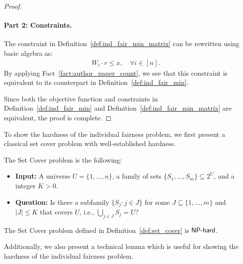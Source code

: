 \begin{proof}
\paragraph{Part 2: Constraints.} The constraint in Definition~\ref{def:ind_fair_min_matrix} can be rewritten using basic algebra as:
     \begin{align*}
         W_i \cdot r \leq x, \quad \forall i \in [n].
     \end{align*}
     By applying Fact~\ref{fact:author_paper_count}, we see that this constraint is equivalent to its counterpart in Definition~\ref{def:ind_fair_min}.

Since both the objective function and constraints in Definition~\ref{def:ind_fair_min} and Definition~\ref{def:ind_fair_min_matrix} are equivalent, the proof is complete.
\end{proof}

To show the hardness of the individual fairness problem, we first present a classical set cover problem with well-established hardness. 

\begin{definition}\label{def:set_cover}
The Set Cover problem is the following: 
\begin{itemize}
    \item {\bf Input:} A universe $U = \{1, \ldots, n\}$, a family of sets 
    $\{S_1, \ldots, S_m\} \subseteq 2^U$, and a integer $K > 0$. 
    \item {\bf Question:} Is there a subfamily $\{S_j : j \in J\}$ for some 
    $J \subseteq \{1,\ldots,m\}$ and $|J| \leq K$ that covers $U$, i.e., $\bigcup_{j \in J} S_j = U$?
\end{itemize}
\end{definition}

\begin{lemma}\label{lem:set_cover_np_hard}
    The Set Cover problem defined in Definition~\ref{def:set_cover} is $\mathsf{NP}\text{-}\mathsf{hard}$.
\end{lemma}

Additionally, we also present a technical lemma which is useful for showing the hardness of the individual fairness problem. 

